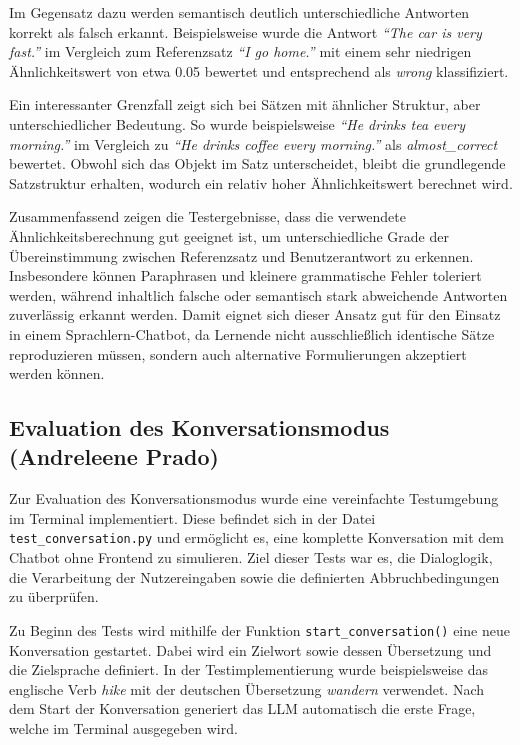 Im Gegensatz dazu werden semantisch deutlich unterschiedliche Antworten korrekt als falsch erkannt. 
Beispielsweise wurde die Antwort \textit{\enquote{The car is very fast.}} im Vergleich zum Referenzsatz \textit{\enquote{I go home.}} mit einem sehr niedrigen Ähnlichkeitswert von etwa 0.05 bewertet und entsprechend als \textit{wrong} klassifiziert. 

Ein interessanter Grenzfall zeigt sich bei Sätzen mit ähnlicher Struktur, aber unterschiedlicher Bedeutung. 
So wurde beispielsweise \textit{\enquote{He drinks tea every morning.}} im Vergleich zu \textit{\enquote{He drinks coffee every morning.}} als \textit{almost\_correct} bewertet. 
Obwohl sich das Objekt im Satz unterscheidet, bleibt die grundlegende Satzstruktur erhalten, wodurch ein relativ hoher Ähnlichkeitswert berechnet wird.

Zusammenfassend zeigen die Testergebnisse, dass die verwendete Ähnlichkeitsberechnung gut geeignet ist, um unterschiedliche Grade der Übereinstimmung zwischen Referenzsatz und Benutzerantwort zu erkennen. 
Insbesondere können Paraphrasen und kleinere grammatische Fehler toleriert werden, während inhaltlich falsche oder semantisch stark abweichende Antworten zuverlässig erkannt werden. 
Damit eignet sich dieser Ansatz gut für den Einsatz in einem Sprachlern-Chatbot, da Lernende nicht ausschließlich identische Sätze reproduzieren müssen, sondern auch alternative Formulierungen akzeptiert werden können.

\subsection{Evaluation des Konversationsmodus (Andreleene Prado)}
Zur Evaluation des Konversationsmodus wurde eine vereinfachte Testumgebung im Terminal implementiert. 
Diese befindet sich in der Datei \texttt{test\_conversation.py} und ermöglicht es, eine komplette Konversation mit dem Chatbot ohne Frontend zu simulieren. 
Ziel dieser Tests war es, die Dialoglogik, die Verarbeitung der Nutzereingaben sowie die definierten Abbruchbedingungen zu überprüfen.

Zu Beginn des Tests wird mithilfe der Funktion \texttt{start\_conversation()} eine neue Konversation gestartet. 
Dabei wird ein Zielwort sowie dessen Übersetzung und die Zielsprache definiert. 
In der Testimplementierung wurde beispielsweise das englische Verb \textit{hike} mit der deutschen Übersetzung \textit{wandern} verwendet. 
Nach dem Start der Konversation generiert das LLM automatisch die erste Frage, welche im Terminal ausgegeben wird.

